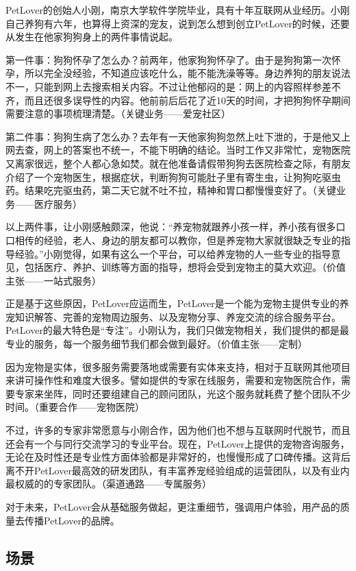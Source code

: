 \documentclass[a4paper]{ctexart}
\begin{document}
PetLover的创始人小刚，南京大学软件学院毕业，具有十年互联网从业经历。小刚自己养狗有六年，也算得上资深的宠友，说到怎么想到创立PetLover的时候，还要从发生在他家狗狗身上的两件事情说起。

第一件事：狗狗怀孕了怎么办？前两年，他家狗狗怀孕了。由于是狗狗第一次怀孕，所以完全没经验，不知道应该吃什么，能不能洗澡等等。身边养狗的朋友说法不一，只能到网上去搜索相关内容。不过让他郁闷的是：网上的内容照样参差不齐，而且还很多误导性的内容。他前前后后花了近10天的时间，才把狗狗怀孕期间需要注意的事项梳理清楚。（关键业务——爱宠社区）

第二件事：狗狗生病了怎么办？去年有一天他家狗狗忽然上吐下泄的，于是他又上网去查，网上的答案也不统一，不能下明确的结论。当时工作又非常忙，宠物医院又离家很远，整个人都心急如焚。就在他准备请假带狗狗去医院检查之际，有朋友介绍了一个宠物医生，根据症状，判断狗狗可能肚子里有寄生虫，让狗狗吃驱虫药。结果吃完驱虫药，第二天它就不吐不拉，精神和胃口都慢慢变好了。（关键业务——医疗服务）

以上两件事，让小刚感触颇深，他说：“养宠物就跟养小孩一样，养小孩有很多口口相传的经验，老人、身边的朋友都可以教你，但是养宠物大家就很缺乏专业的指导经验。”小刚觉得，如果有这么一个平台，可以给养宠物的人一些专业的指导意见，包括医疗、养护、训练等方面的指导，想将会受到宠物主的莫大欢迎。（价值主张——一站式服务）

正是基于这些原因，PetLover应运而生，PetLover是一个能为宠物主提供专业的养宠知识解答、完善的宠物周边服务、以及宠物分享、养宠交流的综合服务平台。PetLover的最大特色是“专注”。小刚认为，我们只做宠物相关，我们提供的都是最专业的服务，每一个服务细节我们都会做到最好。（价值主张——定制）

因为宠物是实体，很多服务需要落地或需要有实体来支持，相对于互联网其他项目来讲可操作性和难度大很多。譬如提供的专家在线服务，需要和宠物医院合作，需要专家来坐阵，同时还要组建自己的顾问团队，光这个服务就耗费了整个团队不少时间。（重要合作——宠物医院）

不过，许多的专家非常愿意与小刚合作，因为他们也不想与互联网时代脱节，而且还会有一个与同行交流学习的专业平台。现在，PetLover上提供的宠物咨询服务，无论在及时性还是专业性方面体验都是非常好的，也慢慢形成了口碑传播。这背后离不开PetLover最高效的研发团队，有丰富养宠经验组成的运营团队，以及有业内最权威的的专家团队。（渠道通路——专属服务）

对于未来，PetLover会从基础服务做起，更注重细节，强调用户体验，用产品的质量去传播PetLover的品牌。

\subsection{场景}
\end{document}
